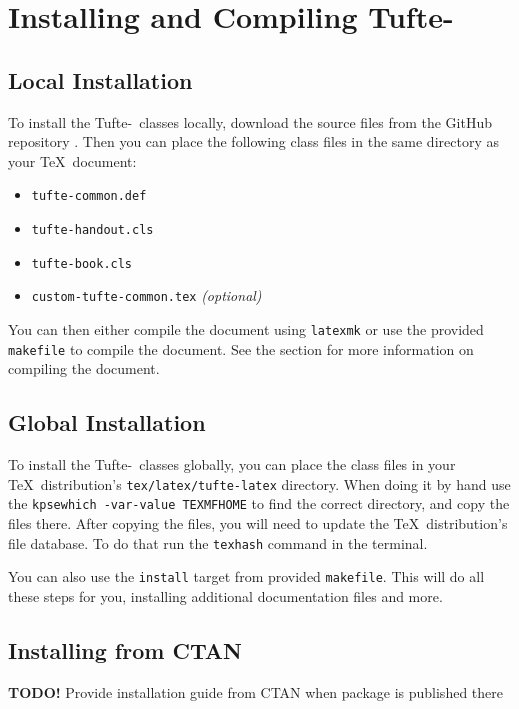 \documentclass[a4paper]{tufte-handout}
\newcommand{\TL}{Tufte-\hologo{LaTeX}\xspace}
\newcommand{\TODO}[1]{\textcolor{tufte-red}{\textbf{TODO!} #1}\xspace}
\begin{document}
\pagebreak
\section[Installing and Compiling Tufte-LaTeX]{Installing and Compiling \TL}\label{sec:installing-compiling-tufte-latex}
\subsection{Local Installation}\label{ssec:local-installation}
To install the \TL\ classes locally, download the source files from the GitHub repository%
.
Then you can place the following class files in the same directory as your \TeX\ document:
\begin{itemize}
  \item \texttt{tufte-common.def}
  \item \texttt{tufte-handout.cls}
  \item \texttt{tufte-book.cls}
  \item \texttt{custom-tufte-common.tex} \textit{(optional)}
\end{itemize}

You can then either compile the document using \texttt{latexmk} or use the provided \texttt{makefile} to compile the document.
See the  section for more information on compiling the document.

\subsection{Global Installation}\label{ssec:global-installation}
To install the \TL\ classes globally, you can place the class files in your \TeX\ distribution's \texttt{tex/latex/tufte-latex} directory.
When doing it by hand use the \texttt{kpsewhich -var-value TEXMFHOME} to find the correct directory, and copy the files there.
After copying the files, you will need to update the \TeX\ distribution's file database.
To do that run the \texttt{texhash} command in the terminal.

You can also use the \texttt{install} target from provided \texttt{makefile}.
This will do all these steps for you, installing additional documentation files and more.

\subsection{Installing from CTAN}\label{ssec:installing-from-ctan}
\TODO{Provide installation guide from CTAN when package is published there}
\end{document}
